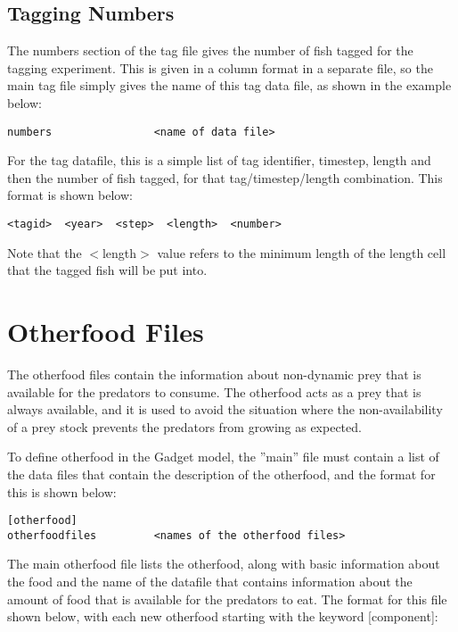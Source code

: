 \documentclass[10pt,twoside]{book}
\begin{document}
\section{Tagging Numbers}\label{sec:tagnumbers}
The numbers section of the tag file gives the number of fish tagged for the tagging experiment.  This is given in a column format in a separate file, so the main tag file simply gives the name of this tag data file, as shown in the example below:

{\small\begin{verbatim}
numbers                <name of data file>
\end{verbatim}}

For the tag datafile, this is a simple list of tag identifier, timestep, length and then the number of fish tagged, for that tag/timestep/length combination.  This format is shown below:

{\small\begin{verbatim}
<tagid>  <year>  <step>  <length>  <number>
\end{verbatim}}

Note that the $<$length$>$ value refers to the minimum length of the length cell that the tagged fish will be put into.

\chapter{Otherfood Files}\label{chap:other}
The otherfood files contain the information about non-dynamic prey that is available for the predators to consume.  The otherfood acts as a prey that is always available, and it is used to avoid the situation where the non-availability of a prey stock prevents the predators from growing as expected.

\bigskip
To define otherfood in the Gadget model, the ''main'' file must contain a list of the data files that contain the description of the otherfood, and the format for this is shown below:

{\small\begin{verbatim}
[otherfood]
otherfoodfiles         <names of the otherfood files>
\end{verbatim}}

The main otherfood file lists the otherfood, along with basic information about the food and the name of the datafile that contains information about the amount of food that is available for the predators to eat.  The format for this file shown below, with each new otherfood starting with the keyword [component]:
\end{document}
